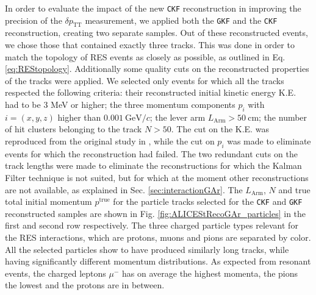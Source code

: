 In order to evaluate the impact of the new \texttt{CKF} reconstruction in improving the precision of the $\delta p_\text{TT}$ measurement, we applied both the \texttt{GKF} and the \texttt{CKF} reconstruction, creating two separate samples. Out of these reconstructed events, we chose those that contained exactly three tracks. This was done in order to match the topology of RES events as closely as possible, as outlined in Eq. \ref{eq:REStopology}. Additionally some quality cuts on the reconstructed properties of the tracks were applied. We selected only events for which all the tracks respected the following criteria: their reconstructed initial kinetic energy K.E. had to be 3 MeV or higher; the three momentum components $p_i$ with $i=(x,y,z)$ higher than $0.001 \ \text{GeV}/c$; the lever arm $L_\text{Arm}>50 \ \text{cm}$; the number of hit clusters belonging to the track $N>50$. The cut on the K.E. was reproduced from the original study in \cite{PhysRevC.94.015503}, while the cut on $p_i$ was made to eliminate events for which the reconstruction had failed. The two redundant cuts on the track lengths were made to eliminate the reconstructions for which the Kalman Filter technique is not suited, but for which at the moment other reconstructions are not available, as explained in Sec. \ref{sec:interactionGAr}. The $L_\text{Arm}$, $N$ and true total initial momentum $p^\text{true}$ for the particle tracks selected for the \texttt{CKF} and \texttt{GKF} reconstructed samples are shown in Fig. \ref{fig:ALICEStRecoGAr_particles} in the first and second row respectively. The three charged particle types relevant for the RES interactions, which are protons, muons and pions are separated by color. All the selected particles show to have produced similarly long tracks, while having significantly different momentum distributions. As expected from resonant events, the charged leptons $\mu^-$ has on average the highest momenta, the pions the lowest and the protons are in between.  


